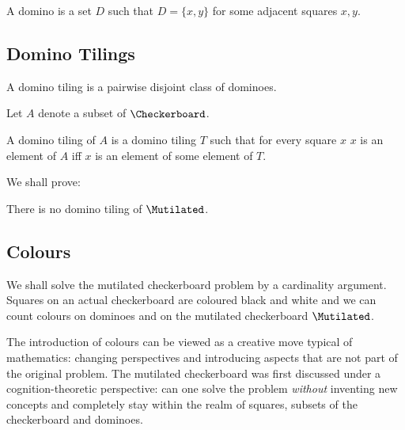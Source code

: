 \begin{forthel}
    \begin{definition}
        A domino is a set $D$ such that $D = \{x,y\}$ for some
        adjacent squares $x, y$.
    \end{definition}
\end{forthel}



\subsection{Domino Tilings}

\begin{forthel}
    \begin{definition}
        A domino tiling is a pairwise disjoint class of dominoes.
    \end{definition}

    Let $A$ denote a subset of $\Checkerboard$.

    \begin{definition}
        A domino tiling of $A$ is a domino tiling $T$
        such that for every square $x$
        $x$ is an element of $A$ iff
        $x$ is an element of some element of $T$.
    \end{definition}
\end{forthel}

We shall prove:

\begin{theorem}
    There is no domino tiling of $\Mutilated$.
\end{theorem}



\subsection{Colours}

We shall solve the mutilated checkerboard problem by a cardinality argument.
Squares on an actual checkerboard are coloured black and white and we can count
colours on dominoes and on the mutilated checkerboard $\Mutilated$.

The introduction of colours can be viewed as a creative move typical of
mathematics: changing perspectives and introducing aspects that are not part
of the original problem. The mutilated checkerboard was first discussed under
a cognition-theoretic perspective: can one solve the problem {\emph{without}}
inventing new concepts and completely stay within the realm of squares,
subsets of the checkerboard and dominoes.


